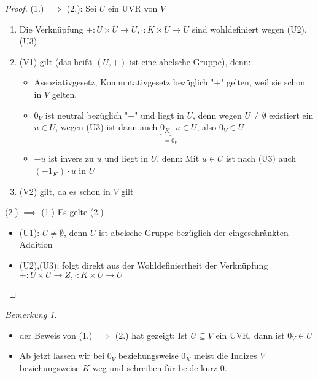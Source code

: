 \documentclass[a4paper]{scrartcl}
\theoremstyle{definition}
\theoremstyle{plain}
\theoremstyle{plain}
\theoremstyle{remark}
\newtheorem{remark}{Bemerkung}
\theoremstyle{remark}
\theoremstyle{remark}
\theoremstyle{remark}
\theoremstyle{remark}
\begin{document}
\begin{proof}
(1.) $\implies$ (2.): Sei $U$ ein UVR von $V$ \\
\begin{enumerate}
\item Die Verknüpfung $+:U\times U\to U, \cdot :K\times U \to U$ sind wohldefiniert wegen (U2), (U3)
\item (V1) gilt (das heißt $(U,+)$ ist eine abelsche Gruppe), denn:
\begin{itemize}
\item Assoziativgesetz, Kommutativgesetz bezüglich "$+$" gelten, weil sie schon in $V$ gelten.
\item $0_V$ ist neutral bezüglich "$+$" und liegt in $U$, denn wegen $U \neq \emptyset$ existiert ein $u\in U$, wegen (U3) ist dann auch $\underbrace{0_K \cdot u}_{= 0_V} \in U$, also $0_V \in U$
\item $-u$ ist invers zu $u$ und liegt in $U$, denn: Mit $u \in U$ ist nach (U3) auch $(-1_K)\cdot u$ in $U$
\end{itemize}
\item (V2) gilt, da es schon in $V$ gilt
\end{enumerate}
(2.) $\implies$ (1.) Es gelte (2.) \\
\begin{itemize}
\item (U1): $U\neq \emptyset$, denn $U$ ist abelsche Gruppe bezüglich der eingeschränkten Addition
\item (U2),(U3): folgt direkt aus der Wohldefiniertheit der Verknüpfung $+: U\times U \to Z, \cdot : K\times U \to U$
\end{itemize}
\end{proof}
\begin{remark}
\begin{itemize}
\item der Beweis von (1.) $\implies$ (2.) hat gezeigt: Ist $U \subseteq V$ ein UVR, dann ist $0_V \in U$
\item Ab jetzt lassen wir bei $0_V$ beziehungsweise $0_K$ meist die Indizes $V$ beziehungsweise $K$ weg und schreiben für beide kurz $0$.
\end{itemize}
\end{remark}
\end{document}
